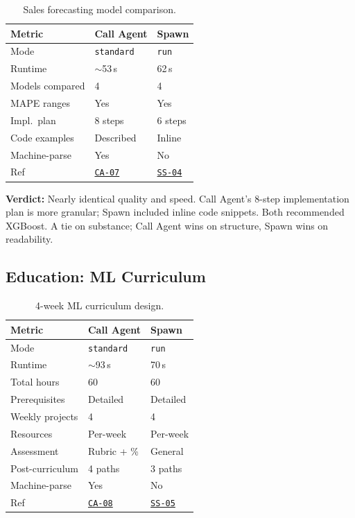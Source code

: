 \documentclass[11pt,twocolumn]{article}
\newcommand{\win}[1]{\cellcolor{winner}#1}
\newcommand{\lose}[1]{\cellcolor{loser}#1}
\newcommand{\tie}[1]{\cellcolor{tied}#1}
\newcommand{\ghbase}{https://github.com/agenticmail/agenticmail/blob/main/research/agent-rpc-vs-spawn}
\begin{document}
\begin{table}[H]
\centering
\caption{Sales forecasting model comparison.}
\begin{tabular}{@{}p{2.2cm}p{2.1cm}p{2.1cm}@{}}
\toprule
\textbf{Metric} & \textbf{Call Agent} & \textbf{Spawn} \\
\midrule
Mode & \texttt{standard} & \texttt{run} \\
Runtime & \win{$\sim$53\,s} & \lose{62\,s} \\
Models compared & \tie{4} & \tie{4} \\
MAPE ranges & \tie{Yes} & \tie{Yes} \\
Impl.\ plan & \win{8 steps} & 6 steps \\
Code examples & Described & \win{Inline} \\
Machine-parse & \win{Yes} & \lose{No} \\
Ref & \href{\ghbase/results-callagent/07-data-science-standard.md}{\texttt{CA-07}} & \href{\ghbase/results/04-data-science.md}{\texttt{SS-04}} \\
\bottomrule
\end{tabular}
\end{table}

\textbf{Verdict:} Nearly identical quality and speed. Call Agent's 8-step implementation plan is more granular; Spawn included inline code snippets. Both recommended XGBoost. A tie on substance; Call Agent wins on structure, Spawn wins on readability.

\subsection{Education: ML Curriculum}

\begin{table}[H]
\centering
\caption{4-week ML curriculum design.}
\begin{tabular}{@{}p{2.2cm}p{2.1cm}p{2.1cm}@{}}
\toprule
\textbf{Metric} & \textbf{Call Agent} & \textbf{Spawn} \\
\midrule
Mode & \texttt{standard} & \texttt{run} \\
Runtime & \lose{$\sim$93\,s} & \win{70\,s} \\
Total hours & \tie{60} & \tie{60} \\
Prerequisites & \tie{Detailed} & \tie{Detailed} \\
Weekly projects & \tie{4} & \tie{4} \\
Resources & \tie{Per-week} & \tie{Per-week} \\
Assessment & \win{Rubric + \%} & General \\
Post-curriculum & \win{4 paths} & 3 paths \\
Machine-parse & \win{Yes} & \lose{No} \\
Ref & \href{\ghbase/results-callagent/08-education-ml-standard.md}{\texttt{CA-08}} & \href{\ghbase/results/05-education-ml.md}{\texttt{SS-05}} \\
\bottomrule
\end{tabular}
\end{table}
\end{document}
